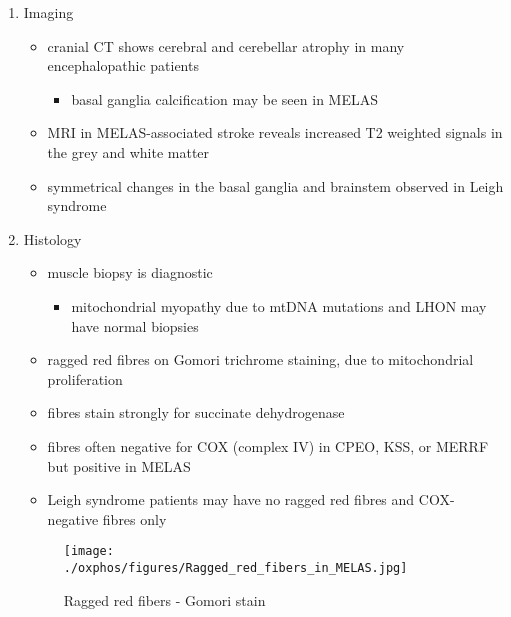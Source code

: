 \documentclass{scrartcl}
\begin{document}
\begin{enumerate}
\item Imaging
\label{sec:org3a08505}
\begin{itemize}
\item cranial CT shows cerebral and cerebellar atrophy in many encephalopathic patients
\begin{itemize}
\item basal ganglia calcification may be seen in MELAS
\end{itemize}
\item MRI in MELAS-associated stroke reveals increased T2 weighted signals in the grey and white matter
\item symmetrical changes in the basal ganglia and brainstem observed in Leigh syndrome
\end{itemize}

\item Histology
\label{sec:orgd48e9ba}
\begin{itemize}
\item muscle biopsy is diagnostic
\begin{itemize}
\item mitochondrial myopathy due to mtDNA mutations and LHON may have normal biopsies
\end{itemize}
\item ragged red fibres on Gomori trichrome staining, due to mitochondrial proliferation
\item fibres stain strongly for succinate dehydrogenase
\item fibres often negative for COX (complex IV) in CPEO, KSS, or MERRF but positive in MELAS
\item Leigh syndrome patients may have no ragged red fibres and  COX-negative fibres only
\end{itemize}

\begin{figure}[htbp]
\centering
\texttt{[image: ./oxphos/figures/Ragged\_red\_fibers\_in\_MELAS.jpg]}
\caption[rrf]{\label{fig:orgde6b2c1}
Ragged red fibers - Gomori stain}
\end{figure}


\end{enumerate}
\end{document}
